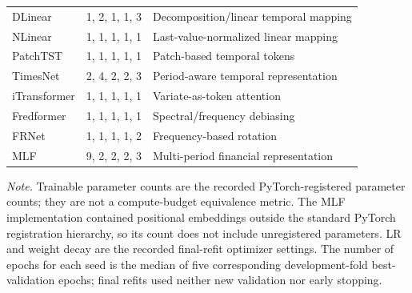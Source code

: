 \begin{table}[htbp]
\begin{tabularx}{\linewidth}{@{}l l X@{}}
\midrule
DLinear & 1, 2, 1, 1, 3 & Decomposition/linear temporal mapping \\
NLinear & 1, 1, 1, 1, 1 & Last-value-normalized linear mapping \\
PatchTST & 1, 1, 1, 1, 1 & Patch-based temporal tokens \\
TimesNet & 2, 4, 2, 2, 3 & Period-aware temporal representation \\
iTransformer & 1, 1, 1, 1, 1 & Variate-as-token attention \\
Fredformer & 1, 1, 1, 1, 1 & Spectral/frequency debiasing \\
FRNet & 1, 1, 1, 1, 2 & Frequency-based rotation \\
MLF & 9, 2, 2, 2, 3 & Multi-period financial representation \\
\bottomrule
\end{tabularx}
\vspace{2pt}
\par\raggedright\footnotesize\emph{Note.} Trainable parameter counts are the recorded PyTorch-registered parameter counts; they are not a compute-budget equivalence metric. The MLF implementation contained positional embeddings outside the standard PyTorch registration hierarchy, so its count does not include unregistered parameters. LR and weight decay are the recorded final-refit optimizer settings. The number of epochs for each seed is the median of five corresponding development-fold best-validation epochs; final refits used neither new validation nor early stopping.
\end{table}
